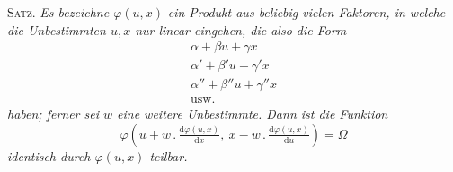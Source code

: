 \textsc{Satz.} \textit{Es bezeichne $\varphi(u,x)$}\textit{ ein Produkt aus beliebig vielen Faktoren, in welche die Unbestimmten $u,x$ nur linear eingehen, die also die Form}
\[
\begin{gathered}
\alpha+\beta u+\gamma x\\
\alpha'+\beta'u+\gamma'x\\
\alpha''+\beta''u+\gamma''x\\
\text{usw.}
\end{gathered}
\]
\textit{haben; ferner sei $w$ eine weitere Unbestimmte. Dann ist die Funktion}
\[
\varphi(u+w\, .\,\tfrac{\mathrm d\varphi(u,x)}{\mathrm dx},\ x-w\, .\,\tfrac{\mathrm d\varphi(u,x)}{\mathrm du})=\Omega
\]
\textit{identisch durch $\varphi(u,x)$ teilbar.}



